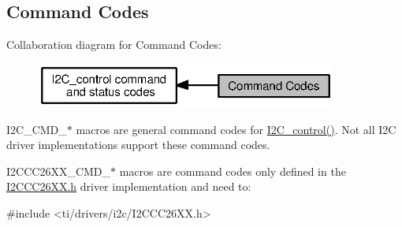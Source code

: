 \subsection{Command Codes}
\label{group___i2_c___c_m_d}
Collaboration diagram for Command Codes\+:
\nopagebreak
\begin{figure}[H]
\begin{center}
\leavevmode
\includegraphics[width=281pt]{group___i2_c___c_m_d}
\end{center}
\end{figure}
I2\+C\+\_\+\+C\+M\+D\+\_\+$\ast$ macros are general command codes for \hyperlink{_i2_c_8h_a633003582213a5098467a4e647cc52f9}{I2\+C\+\_\+control()}. Not all I2\+C driver implementations support these command codes.

I2\+C\+C\+C26\+X\+X\+\_\+\+C\+M\+D\+\_\+$\ast$ macros are command codes only defined in the \hyperlink{_i2_c_c_c26_x_x_8h}{I2\+C\+C\+C26\+X\+X.\+h} driver implementation and need to\+: 
\begin{DoxyCode}
\textcolor{preprocessor}{#include <ti/drivers/i2c/I2CCC26XX.h>}
\end{DoxyCode}
 